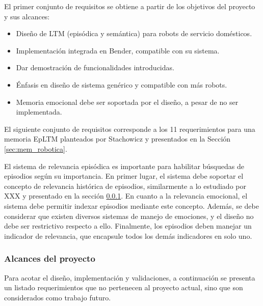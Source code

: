 El primer conjunto de requisitos se obtiene a partir de los objetivos del proyecto y sus alcances:
\begin{itemize}
\item Diseño de LTM (episódica y semántica) para robots de servicio domésticos.
\item Implementación integrada en Bender, compatible con su sistema.
\item Dar demostración de funcionalidades introducidas.
\item Énfasis en diseño de sistema genérico y compatible con más robots.
\item Memoria emocional debe ser soportada por el diseño, a pesar de no ser implementada.
\end{itemize}

El siguiente conjunto de requisitos corresponde a los 11 requerimientos para una memoria EpLTM planteados por Stachowicz\cite{Stachowicz2012} y presentados en la Sección \ref{sec:mem_robotica}. 

El sistema de relevancia episódica es importante para habilitar búsquedas de episodios según su importancia. En primer lugar, el sistema debe soportar el concepto de relevancia histórica de episodios, similarmente a lo estudiado por XXX \cite{} y presentado en la sección \ref{}. En cuanto a la relevancia emocional, el sistema debe permitir indexar episodios mediante este concepto. Además, se debe considerar que existen diversos sistemas de manejo de emociones, y el diseño no debe ser restrictivo respecto a ello. Finalmente, los episodios deben manejar un indicador de relevancia, que encapsule todos los demás indicadores en solo uno.

\subsubsection{Alcances del proyecto}


Para acotar el diseño, implementación y validaciones, a continuación se presenta un listado requerimientos que no pertenecen al proyecto actual, sino que son considerados como trabajo futuro.

